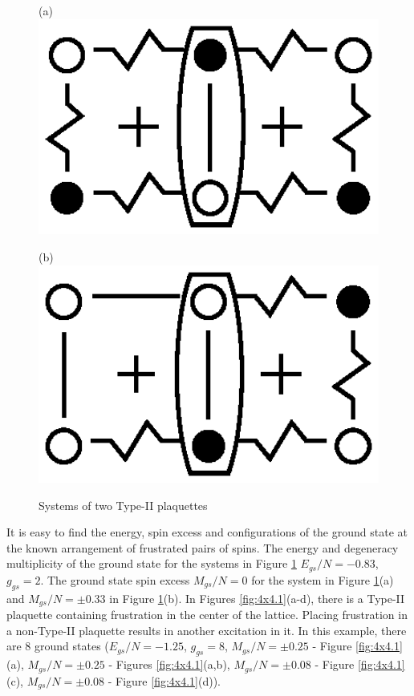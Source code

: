 \documentclass[preprint,12pt]{elsarticle}
\begin{document}
\begin{figure}[H]
	\centering
	\begin{minipage}{0.2\textwidth}
		\centering
		(a)
		\includegraphics[width=1\textwidth]{pictures/Type2_3x2.eps}
		\label{fig:Type2_3x2}
	\end{minipage}
	\hspace{20pt}
	\begin{minipage}{0.2\textwidth}
		\centering
		(b)
		\includegraphics[width=1\textwidth]{pictures/Type2_3x2_2.eps}
		\label{fig:Type2_3x2_2}
	\end{minipage}
	\caption{Systems of two Type-II plaquettes}
	\label{fig:Type2_32}
\end{figure}


It is easy to find the energy, spin excess and configurations of the ground state at the known arrangement of frustrated pairs of spins. The energy and degeneracy multiplicity of the ground state for the systems in Figure \ref{fig:Type2_32} $E_{gs}/N=-0.83$, $g_{gs}=2$. The ground state spin excess $M_{gs}/N=0$ for the system in Figure \ref{fig:Type2_32}(a) and $M_{gs}/N=\pm 0.33$ in Figure \ref{fig:Type2_32}(b).
In Figures \ref{fig:4x4.1}(a-d), there is a Type-II plaquette containing frustration in the center of the lattice. Placing frustration in a non-Type-II plaquette results in another excitation in it. In this example, there are 8 ground states ($E_{gs}/N=-1.25$, $g_{gs}=8$, $M_{gs}/N=\pm 0.25$ - Figure \ref{fig:4x4.1}(a), $M_{gs}/N=\pm 0.25$ - Figures \ref{fig:4x4.1}(a,b), $M_{gs}/N=\pm 0.08$ - Figure \ref{fig:4x4.1}(c), $M_{gs}/N=\pm 0.08$ - Figure \ref{fig:4x4.1}(d)). 
\end{document}
